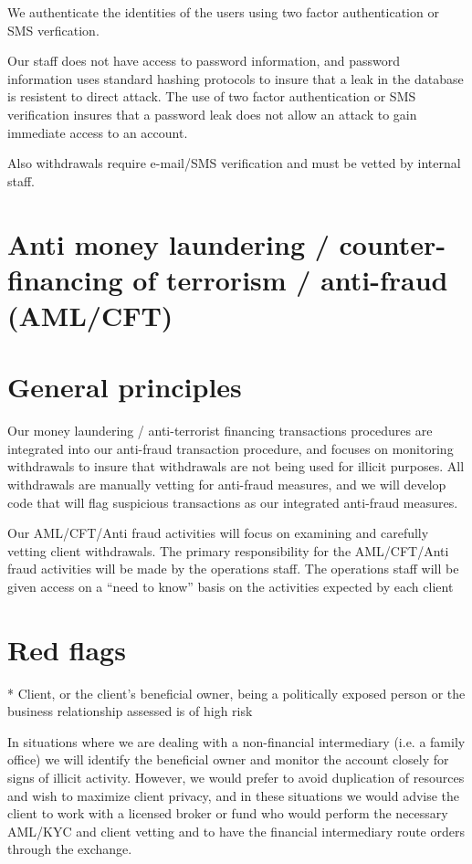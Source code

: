 We authenticate the identities of the users using two factor
authentication or SMS verfication.

Our staff does not have access to password information, and password
information uses standard hashing protocols to insure that a leak in
the database is resistent to direct attack.  The use of two factor
authentication or SMS verification insures that a password leak does
not allow an attack to gain immediate access to an account.

Also withdrawals require e-mail/SMS verification and must be vetted by
internal staff.

\section{Anti money laundering / counter-financing of terrorism /
  anti-fraud (AML/CFT)}

\section{General principles}

Our money laundering / anti-terrorist financing transactions
procedures are integrated into our anti-fraud transaction procedure,
and focuses on monitoring withdrawals to insure that withdrawals are
not being used for illicit purposes.  All withdrawals are manually
vetting for anti-fraud measures, and we will develop code that will
flag suspicious transactions as our integrated anti-fraud measures.

Our AML/CFT/Anti fraud activities will focus on examining and
carefully vetting client withdrawals.  The primary responsibility for
the AML/CFT/Anti fraud activities will be made by the operations
staff.  The operations staff will be given access on a ``need to
know'' basis on the activities expected by each client


\section{Red flags}

* Client, or the client’s beneficial owner, being a politically
exposed person or the business relationship assessed is of high risk

In situations where we are dealing with a non-financial intermediary
(i.e. a family office) we will identify the beneficial owner and
monitor the account closely for signs of illicit activity.  However,
we would prefer to avoid duplication of resources and wish to maximize
client privacy, and in these situations we would advise the client to
work with a licensed broker or fund who would perform the necessary
AML/KYC and client vetting and to have the financial intermediary
route orders through the exchange.

